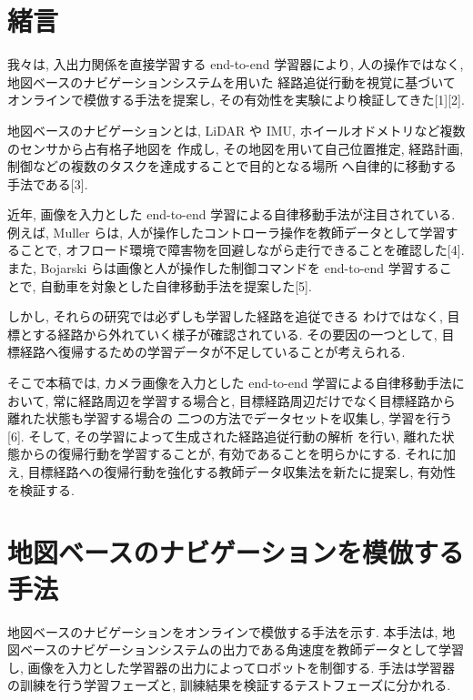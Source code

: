 \documentclass{jarticle}
\begin{document}
\date{} 

\maketitle
\thispagestyle{empty}
\pagestyle{empty}

\small

\section{緒言}
我々は, 入出力関係を直接学習する end-to-end 学習器により,
人の操作ではなく, 地図ベースのナビゲーションシステムを用いた
経路追従行動を視覚に基づいてオンラインで模倣する手法を提案し,
その有効性を実験により検証してきた[1][2].

地図ベースのナビゲーションとは, LiDAR や IMU, ホイールオドメトリなど複数のセンサから占有格子地図を
作成し, その地図を用いて自己位置推定, 経路計画, 制御などの複数のタスクを達成することで目的となる場所
へ自律的に移動する手法である[3].

近年, 画像を入力とした end-to-end 学習による自律移動手法が注目されている.
例えば, Muller らは, 人が操作したコントローラ操作を教師データとして学習することで, 
オフロード環境で障害物を回避しながら走行できることを確認した[4].
また, Bojarski らは画像と人が操作した制御コマンドを end-to-end 学習するこ
とで, 自動車を対象とした自律移動手法を提案した[5].

しかし, それらの研究では必ずしも学習した経路を追従できる
わけではなく, 目標とする経路から外れていく様子が確認されている.
その要因の一つとして, 目標経路へ復帰するための学習データが不足していることが考えられる.

そこで本稿では, カメラ画像を入力とした end-to-end 学習による自律移動手法において,
常に経路周辺を学習する場合と, 目標経路周辺だけでなく目標経路から離れた状態も学習する場合の
二つの方法でデータセットを収集し, 学習を行う[6]. そして, その学習によって生成された経路追従行動の解析
を行い, 離れた状態からの復帰行動を学習することが, 有効であることを明らかにする. それに加え, 
目標経路への復帰行動を強化する教師データ収集法を新たに提案し, 有効性を検証する.

 
\section{地図ベースのナビゲーションを模倣する手法}
地図ベースのナビゲーションをオンラインで模倣する手法を示す.
本手法は, 地図ベースのナビゲーションシステムの出力である角速度を教師データとして学習し, 
画像を入力とした学習器の出力によってロボットを制御する. 
手法は学習器の訓練を行う学習フェーズと, 訓練結果を検証するテストフェーズに分かれる.
\end{document}
